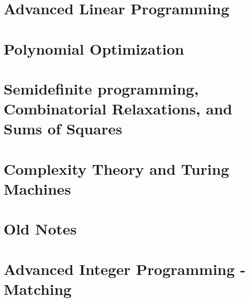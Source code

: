 \section{Advanced Linear Programming}

\section{Polynomial Optimization}

\section{Semidefinite programming, Combinatorial Relaxations, and Sums of Squares}


\section{Complexity Theory and Turing Machines}


\section{Old Notes}





\section{Advanced Integer Programming - Matching}


